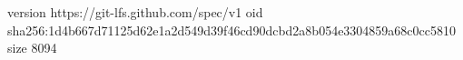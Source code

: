 version https://git-lfs.github.com/spec/v1
oid sha256:1d4b667d71125d62e1a2d549d39f46cd90dcbd2a8b054e3304859a68c0cc5810
size 8094
